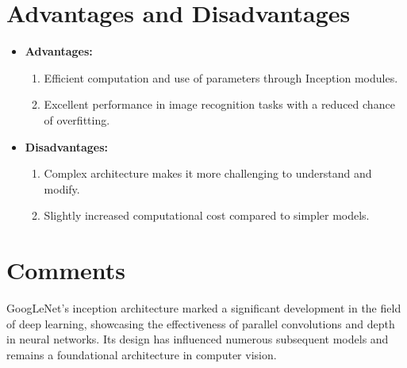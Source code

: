 \section{Advantages and Disadvantages}
\begin{itemize}
    \item \textbf{Advantages:}
    \begin{enumerate}
        \item Efficient computation and use of parameters through Inception modules.
        \item Excellent performance in image recognition tasks with a reduced chance of overfitting.
    \end{enumerate}
    \item \textbf{Disadvantages:}
    \begin{enumerate}
        \item Complex architecture makes it more challenging to understand and modify.
        \item Slightly increased computational cost compared to simpler models.
    \end{enumerate}
\end{itemize}

\section{Comments}
GoogLeNet's inception architecture marked a significant development in the field of deep learning, showcasing the effectiveness of parallel convolutions and depth in neural networks. Its design has influenced numerous subsequent models and remains a foundational architecture in computer vision.
